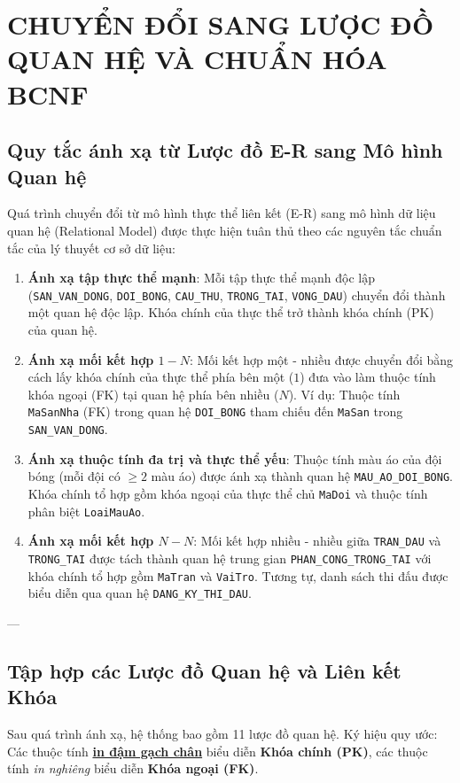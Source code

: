 \chapter{CHUYỂN ĐỔI SANG LƯỢC ĐỒ QUAN HỆ VÀ CHUẨN HÓA BCNF}

\section{Quy tắc ánh xạ từ Lược đồ E-R sang Mô hình Quan hệ}

Quá trình chuyển đổi từ mô hình thực thể liên kết (E-R) sang mô hình dữ liệu quan hệ (Relational Model) được thực hiện tuân thủ theo các nguyên tắc chuẩn tắc của lý thuyết cơ sở dữ liệu:
\begin{enumerate}
    \item \textbf{Ánh xạ tập thực thể mạnh}: Mỗi tập thực thể mạnh độc lập (\texttt{SAN\_VAN\_DONG}, \texttt{DOI\_BONG}, \texttt{CAU\_THU}, \texttt{TRONG\_TAI}, \texttt{VONG\_DAU}) chuyển đổi thành một quan hệ độc lập. Khóa chính của thực thể trở thành khóa chính (PK) của quan hệ.
    \item \textbf{Ánh xạ mối kết hợp $1 - N$}: Mối kết hợp một - nhiều được chuyển đổi bằng cách lấy khóa chính của thực thể phía bên một ($1$) đưa vào làm thuộc tính khóa ngoại (FK) tại quan hệ phía bên nhiều ($N$). Ví dụ: Thuộc tính \texttt{MaSanNha} (FK) trong quan hệ \texttt{DOI\_BONG} tham chiếu đến \texttt{MaSan} trong \texttt{SAN\_VAN\_DONG}.
    \item \textbf{Ánh xạ thuộc tính đa trị và thực thể yếu}: Thuộc tính màu áo của đội bóng (mỗi đội có $\ge 2$ màu áo) được ánh xạ thành quan hệ \texttt{MAU\_AO\_DOI\_BONG}. Khóa chính tổ hợp gồm khóa ngoại của thực thể chủ \texttt{MaDoi} và thuộc tính phân biệt \texttt{LoaiMauAo}.
    \item \textbf{Ánh xạ mối kết hợp $N - N$}: Mối kết hợp nhiều - nhiều giữa \texttt{TRAN\_DAU} và \texttt{TRONG\_TAI} được tách thành quan hệ trung gian \texttt{PHAN\_CONG\_TRONG\_TAI} với khóa chính tổ hợp gồm \texttt{MaTran} và \texttt{VaiTro}. Tương tự, danh sách thi đấu được biểu diễn qua quan hệ \texttt{DANG\_KY\_THI\_DAU}.
\end{enumerate}

---

\section{Tập hợp các Lược đồ Quan hệ và Liên kết Khóa}

Sau quá trình ánh xạ, hệ thống bao gồm 11 lược đồ quan hệ. Ký hiệu quy ước: Các thuộc tính \underline{\textbf{in đậm gạch chân}} biểu diễn \textbf{Khóa chính (PK)}, các thuộc tính \textit{in nghiêng} biểu diễn \textbf{Khóa ngoại (FK)}.

